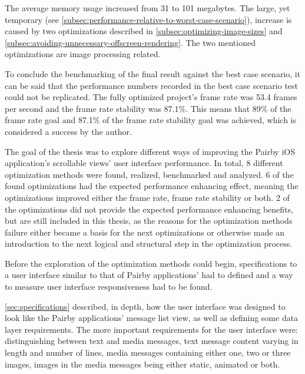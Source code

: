 \documentclass[a4paper,12pt]{article}
\begin{document}
The average memory usage increased from 31 to 101 megabytes. The large, yet temporary (see \autoref{subsec:performance-relative-to-worst-case-scenario}), increase is caused by two optimizations described in \autoref{subsec:optimizing-image-sizes} and \autoref{subsec:avoiding-unnecessary-offscreen-rendering}. The two mentioned optimizations are image processing related.

To conclude the benchmarking of the final result against the best case scenario, it can be said that the performance numbers recorded in the best case scenario test could not be replicated. The fully optimized project's frame rate was 53.4 frames per second and the frame rate stability was 87.1\%. This means that 89\% of the frame rate goal and 87.1\% of the frame rate stability goal was achieved, which is considered a success by the author.

The goal of the thesis was to explore different ways of improving the Pairby iOS application's scrollable views' user interface performance. In total, 8 different optimization methods were found, realized, benchmarked and analyzed. 6 of the found optimizations had the expected performance enhancing effect, meaning the optimizations improved either the frame rate, frame rate stability or both. 2 of the optimizations did not provide the expected performance enhancing benefits, but are still included in this thesis, as the reasons for the optimization methods failure either became a basis for the next optimizations or otherwise made an introduction to the next logical and structural step in the optimization process.

Before the exploration of the optimization methods could begin, specifications to a user interface similar to that of Pairby applications' had to defined and a way to measure user interface responsiveness had to be found.

\autoref{sec:specifications} described, in depth, how the user interface was designed to look like the Pairby applications' message list view, as well as defining some data layer requirements. The more important requirements for the user interface were: distinguishing between text and media messages, text message content varying in length and number of lines, media messages containing either one, two or three images, images in the media messages being either static, animated or both.
\end{document}

